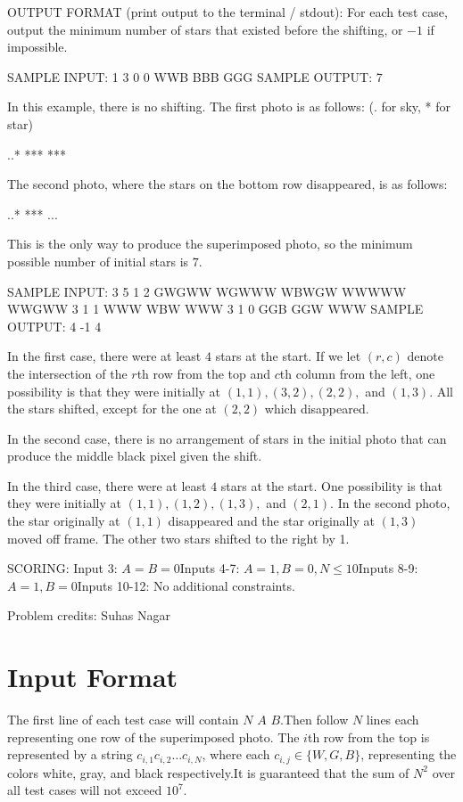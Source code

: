 \documentclass[12pt]{article}
\begin{document}
OUTPUT FORMAT (print output to the terminal / stdout):
For each test case, output the minimum number of stars that existed before the
shifting, or $-1$ if impossible.

SAMPLE INPUT:
1
3 0 0
WWB
BBB
GGG
SAMPLE OUTPUT: 
7

In this example, there is no shifting. The first photo is as follows: (. for
sky, * for star)


..*
***
***

The second photo, where the stars on the bottom row disappeared, is as follows:


..*
***
...

This is the only way to produce the superimposed photo, so the minimum possible
number of initial stars is $7$.

SAMPLE INPUT:
3
5 1 2
GWGWW
WGWWW
WBWGW
WWWWW
WWGWW
3 1 1
WWW
WBW
WWW
3 1 0
GGB
GGW
WWW
SAMPLE OUTPUT: 
4
-1
4

In the first case, there were at least $4$ stars at the start. If we let $(r,c)$
denote the intersection of the $r$th row from the top and $c$th column from the
left, one possibility is that they were initially at $(1,1), (3,2), (2,2),$  and
$(1,3)$. All the stars shifted, except for the one at $(2,2)$ which disappeared.

In the second case, there is no arrangement of stars in the initial photo that
can produce the middle black pixel given the shift.

In the third case, there were at least $4$ stars at the start. One possibility
is that they were initially at $(1,1), (1,2), (1,3),$ and $(2,1)$. In the second
photo, the star originally at $(1,1)$ disappeared and the star originally at
$(1,3)$ moved off frame. The other two stars shifted to the right by 1.

SCORING:
Input 3: $A=B=0$Inputs 4-7: $A=1, B=0, N\le 10$Inputs 8-9: $A=1, B=0$Inputs 10-12: No additional constraints.


Problem credits: Suhas Nagar



\section*{Input Format}
The first line of each test case will contain $N$ $A$ $B$.Then follow $N$ lines each representing one row of the superimposed photo.  The
$i$th row from the top is represented by a string $c_{i,1}c_{i,2}\dots c_{i,N}$,
where each $c_{i,j} \in \{W,G,B\}$, representing the colors white, gray, and
black respectively.It is guaranteed that the sum of $N^2$ over all test cases will not exceed
$10^7$.
\end{document}
